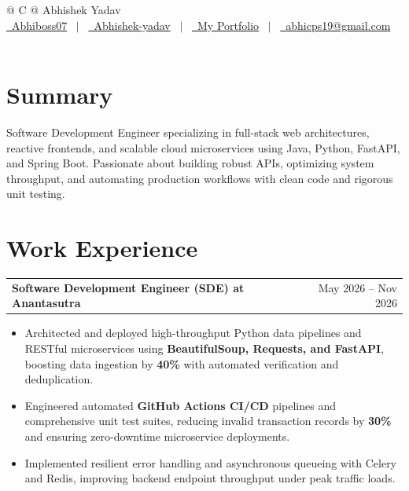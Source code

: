 \documentclass[a4paper,10pt]{article}
\makeatletter
\newenvironment{joblong}[2]
    {
    \begin{tabularx}{\linewidth}{@{}l X r@{}}
    \textbf{#1} & \hfill &  #2 \\[3.50pt]
    \end{tabularx}
    \begin{minipage}[t]{\linewidth}
    \begin{itemize}[nosep,after=\strut, leftmargin=1em, itemsep=3pt,label=--]
    }
    {
    \end{itemize}
    \end{minipage}
    }
\makeatother
\begin{document}
\pagestyle{empty}

\begin{tabularx}{\linewidth}{@{} C @{}}
\Huge{Abhishek Yadav}\\[7.5pt]
\href{https://github.com/Abhiboss07}{\raisebox{-0.05\height}\faGithub\ Abhiboss07} \ $|$ \
\href{https://linkedin.com/in/abhishek-yadav-4738032b7/}{\raisebox{-0.05\height}\faLinkedin\ Abhishek-yadav} \ $|$ \
\href{https://portfolio-abhishek-01.vercel.app}{\raisebox{-0.05\height}\faGlobe \ My Portfolio} \ $|$ \
\href{mailto:abhicps19@gmail.com}{\raisebox{-0.05\height}\faEnvelope \ abhicps19@gmail.com} \ \ \\
\end{tabularx}

\section{Summary}
Software Development Engineer specializing in full-stack web architectures, reactive frontends, and scalable cloud microservices using Java, Python, FastAPI, and Spring Boot. Passionate about building robust APIs, optimizing system throughput, and automating production workflows with clean code and rigorous unit testing.

\section{Work Experience}

\begin{joblong}{Software Development Engineer (SDE) at Anantasutra}{May 2026 -- Nov 2026}
\item Architected and deployed high-throughput Python data pipelines and RESTful microservices using \textbf{BeautifulSoup, Requests, and FastAPI}, boosting data ingestion by \textbf{40\%} with automated verification and deduplication.
\item Engineered automated \textbf{GitHub Actions CI/CD} pipelines and comprehensive unit test suites, reducing invalid transaction records by \textbf{30\%} and ensuring zero-downtime microservice deployments.
\item Implemented resilient error handling and asynchronous queueing with Celery and Redis, improving backend endpoint throughput under peak traffic loads.
\end{joblong}
\end{document}

